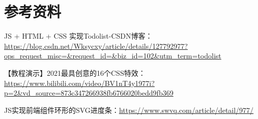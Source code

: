 \documentclass[UTF8]{ctexart}
\begin{document}
	
	\section{参考资料} %
	JS + HTML + CSS 实现Todolist-CSDN博客： \url{https://blog.csdn.net/Wksycxy/article/details/127792977?ops_request_misc=&request_id=&biz_id=102&utm_term=todolist}

	
	【教程演示】2021最具创意的16个CSS特效：\url{https://www.bilibili.com/video/BV1nT4y1977i?p=2&vd_source=873c347266938fb6766020bedd9fb369}
	
	JS实现前端组件环形的SVG进度条：\url{https://www.swvq.com/article/detail/977/}
\end{document}
